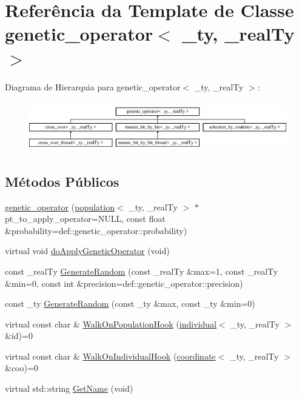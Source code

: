 \hypertarget{classgenetic__operator}{
\section{Referência da Template de Classe genetic\_\-operator$<$ \_\-ty, \_\-realTy $>$}
\label{classgenetic__operator}
}
Diagrama de Hierarquia para genetic\_\-operator$<$ \_\-ty, \_\-realTy $>$:\begin{figure}[H]
\begin{center}
\leavevmode
\includegraphics[height=2.21344cm]{classgenetic__operator}
\end{center}
\end{figure}
\subsection*{Métodos Públicos}
\begin{DoxyCompactItemize}
\item 
\hyperlink{classgenetic__operator_a114de57cea1aa2b6db81389ddf5be520}{genetic\_\-operator} (\hyperlink{classpopulation}{population}$<$ \_\-ty, \_\-realTy $>$ $\ast$pt\_\-to\_\-apply\_\-operator=NULL, const float \&probability=def::genetic\_\-operator::probability)
\item 
virtual void \hyperlink{classgenetic__operator_a70569d059114efa73bcd45a264953d13}{doApplyGeneticOperator} (void)
\item 
const \_\-realTy \hyperlink{classgenetic__operator_a406eeb5144dd74698fcd9a120f021aba}{GenerateRandom} (const \_\-realTy \&max=1, const \_\-realTy \&min=0, const int \&precision=def::genetic\_\-operator::precision)
\item 
const \_\-ty \hyperlink{classgenetic__operator_ad9f7ea3ff91063cde8959794b1ac5679}{GenerateRandom} (const \_\-ty \&max, const \_\-ty \&min=0)
\item 
virtual const char \& \hyperlink{classgenetic__operator_a3405bb5335111bd675d408aa8db052fa}{WalkOnPopulationHook} (\hyperlink{classindividual}{individual}$<$ \_\-ty, \_\-realTy $>$ \&id)=0
\item 
virtual const char \& \hyperlink{classgenetic__operator_a2124d70b28b35d3114eb3e3ffa72baef}{WalkOnIndividualHook} (\hyperlink{classcoordinate}{coordinate}$<$ \_\-ty, \_\-realTy $>$ \&coo)=0
\item 
virtual std::string \hyperlink{classgenetic__operator_ae0f79368c0b4ad0cff3f608727bd87f5}{GetName} (void)
\end{DoxyCompactItemize}
